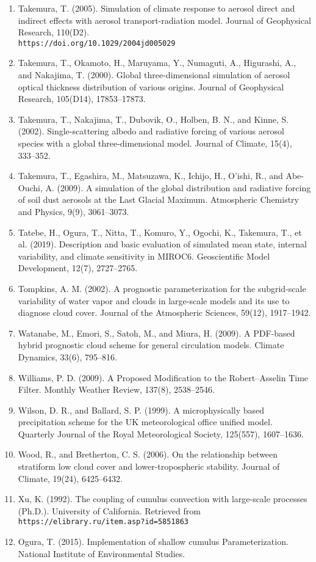 \begin{enumerate}
\item Takemura, T. (2005). Simulation of climate response to aerosol direct and indirect effects with aerosol transport-radiation model. Journal of Geophysical Research, 110(D2). \\
\texttt{https://doi.org/10.1029/2004jd005029}
\item Takemura, T., Okamoto, H., Maruyama, Y., Numaguti, A., Higurashi, A., and Nakajima, T. (2000). Global three-dimensional simulation of aerosol optical thickness distribution of various origins. Journal of Geophysical Research, 105(D14), 17853–17873.
\item Takemura, T., Nakajima, T., Dubovik, O., Holben, B. N., and Kinne, S. (2002). Single-scattering albedo and radiative forcing of various aerosol species with a global three-dimensional model. Journal of Climate, 15(4), 333–352.
\item Takemura, T., Egashira, M., Matsuzawa, K., Ichijo, H., O’ishi, R., and Abe-Ouchi, A. (2009). A simulation of the global distribution and radiative forcing of soil dust aerosols at the Last Glacial Maximum. Atmospheric Chemistry and Physics, 9(9), 3061–3073.
\item Tatebe, H., Ogura, T., Nitta, T., Komuro, Y., Ogochi, K., Takemura, T., et al. (2019). Description and basic evaluation of simulated mean state, internal variability, and climate sensitivity in MIROC6. Geoscientific Model Development, 12(7), 2727–2765.
\item Tompkins, A. M. (2002). A prognostic parameterization for the subgrid-scale variability of water vapor and clouds in large-scale models and its use to diagnose cloud cover. Journal of the Atmospheric Sciences, 59(12), 1917–1942.
\item Watanabe, M., Emori, S., Satoh, M., and Miura, H. (2009). A PDF-based hybrid prognostic cloud scheme for general circulation models. Climate Dynamics, 33(6), 795–816.
\item Williams, P. D. (2009). A Proposed Modification to the Robert–Asselin Time Filter. Monthly Weather Review, 137(8), 2538–2546.
\item Wilson, D. R., and Ballard, S. P. (1999). A microphysically based precipitation scheme for the UK meteorological office unified model. Quarterly Journal of the Royal Meteorological Society, 125(557), 1607–1636.
\item Wood, R., and Bretherton, C. S. (2006). On the relationship between stratiform low cloud cover and lower-tropospheric stability. Journal of Climate, 19(24), 6425–6432.
\item Xu, K. (1992). The coupling of cumulus convection with large-scale processes (Ph.D.). University of California. Retrieved from \\
\texttt{https://elibrary.ru/item.asp?id=5851863}
\item Ogura, T. (2015). Implementation of shallow cumulus Parameterization. National Institute of Environmental Studies.
\end{enumerate}
